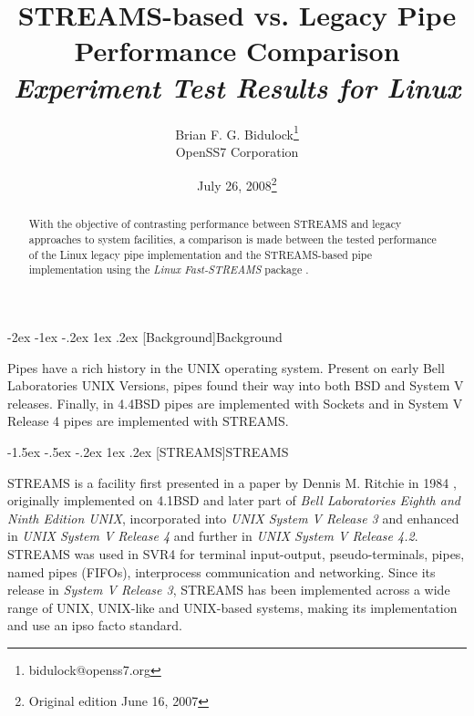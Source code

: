 \documentclass[letterpaper,final,notitlepage,twocolumn,10pt,twoside]{article}
\makeatletter
\let\large = \normalsize
\let\normalsize = \small
\let\small = \footnotesize
\let\footnotesize = \scriptsize
\let\scriptsize = \tiny
\renewcommand\section{\@startsection {section}{1}{\z@}%
                                   {-2ex \@plus -1ex \@minus -.2ex}%
                                   {1ex \@plus .2ex}%
                                   {\normalfont\large\bfseries}}
\renewcommand\subsection{\@startsection{subsection}{2}{\z@}%
                                     {-1.5ex \@plus -.5ex \@minus -.2ex}%
                                     {1ex \@plus .2ex}%
                                     {\normalfont\normalsize\bfseries}}
\makeatother
\begin{document}

\title{STREAMS-based vs. Legacy Pipe Performance Comparison\\[0.5ex]
	{\large \textsl{Experiment Test Results for Linux}}}
\author{Brian F. G. Bidulock\thanks{bidulock@openss7.org}\\
	OpenSS7 Corporation}
\date{July 26, 2008\thanks{Original edition June 16, 2007}}
\maketitle

\begin{abstract}
With the objective of contrasting performance between STREAMS and legacy approaches to system
facilities, a comparison is made between the tested performance of the Linux legacy pipe
implementation and the STREAMS-based pipe
implementation using the \textsl{Linux Fast-STREAMS} package \cite[]{LfS}.
\end{abstract}


\section[Background]{Background}

Pipes have a rich history in the UNIX operating system.  Present on early Bell Laboratories UNIX
Versions, pipes found their way into both BSD and System V releases.  Finally, in 4.4BSD pipes are
implemented with Sockets and in System V Release 4 pipes are implemented with STREAMS.

\subsection[STREAMS]{STREAMS}

STREAMS is a facility first presented in a paper by Dennis M. Ritchie in 1984 \cite[]{Ritchie84},
originally implemented on 4.1BSD and later part of \textsl{Bell Laboratories Eighth and Ninth Edition UNIX},
incorporated into \textsl{UNIX System V Release 3} and enhanced in \textsl{UNIX System V Release 4}
and further in \textsl{UNIX System V Release 4.2}.  STREAMS was used in SVR4 for terminal
input-output, pseudo-terminals, pipes, named pipes (FIFOs), interprocess communication and
networking.  Since its release in
\textsl{System V Release 3}, STREAMS has been implemented across a wide range of UNIX, UNIX-like and
UNIX-based systems, making its implementation and use an ipso facto standard.
\end{document}
